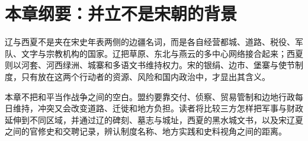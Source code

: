 \section{本章纲要：并立不是宋朝的背景}

辽与西夏不是夹在宋史年表两侧的边疆名词，而是各自经营都城、道路、税役、军队、文字与宗教机构的国家。辽把草原、东北与燕云的多中心网络接合起来；西夏则以河套、河西绿洲、城寨和多语文书维持权力。宋的银绢、边市、堡寨与使节制度，只有放在这两个行动者的资源、风险和国内政治中，才显出其含义。

本章不把和平当作战争之间的空白。盟约要靠交付、侦察、贸易管制和边地行政每日维持，冲突又会改变道路、迁徙和地方负担。读者将比较三方怎样把军事与财政延伸到不同区域，并通过辽的碑刻、墓志与城址，西夏的黑水城文书，以及宋辽夏之间的官修史和交聘记录，辨认制度名称、地方实践和史料视角之间的距离。

